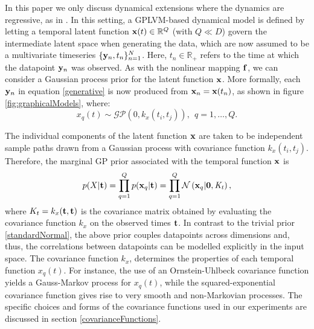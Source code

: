 In this paper we only discuss dynamical extensions where the dynamics are regressive, as in \citep{hgplvm}.
In this setting, a GPLVM-based dynamical model is defined by letting
a temporal latent function $\mathbf{x}(t) \in \mathbb{R}^Q$ (with $Q \ll D$) 
govern the intermediate latent space when
generating the data, which are now assumed to be a multivariate
timeseries $\{\mathbf{y}_n,t_n\}_{n=1}^N$. Here, $t_n \in \mathbb{R}_+$
refers to the time at which the datapoint $\mathbf{y}_n$ was observed. As with
the nonlinear mapping $\mathbf{f}$, we can consider a Gaussian process prior for
the latent function $\mathbf{x}$.
More formally, each $\mathbf{y}_n$ in equation \eqref{generative} is now produced
from $\mathbf{x}_n = \mathbf{x}(t_n)$, as shown in figure
 \ref{fig:graphicalModels}, where:
\begin{equation}
  \label{xt}
  x_q(t)  \sim \mathcal{GP}(0, k_x(t_i,t_j)), \ \ q=1,\ldots,Q .    
\end{equation}

\noindent The individual components of the latent function $\mathbf{x}$ are taken to be independent sample paths drawn from
a Gaussian process with covariance function $k_x(t_i,t_j)$. 
Therefore, the marginal GP prior associated with the temporal function $\mathbf{x}$ is
\begin{equation}
p(X | \mathbf{t})  = \prod_{q=1}^Q p(\mathbf{x}_q|\mathbf{t}) = \prod_{q=1}^Q \mathcal{N} \left( \mathbf{x}_q | \mathbf{0},
  \mathit{K_t} \right),
\label{priorXgivenT}
\end{equation}
\noindent where $K_t = k_x(\mathbf{t},\mathbf{t})$ is the covariance matrix obtained by
evaluating the covariance function $\mathit{k}_x$ on the observed times
$\mathbf{t}$. In contrast to the trivial prior \eqref{standardNormal}, the above prior couples datapoints across dimensions and, thus,
the correlations between datapoints can be modelled explicitly in the input space.
%
The covariance function $k_x$, 
determines the properties of each temporal function $x_q(t)$.
 For instance, the use of an Ornstein-Uhlbeck
covariance function yields a Gauss-Markov process for $x_q(t)$, while
the squared-exponential covariance function gives rise to very smooth and
non-Markovian processes. The specific choices and forms of the covariance
functions used in our experiments are discussed in section \ref{covarianceFunctions}.


